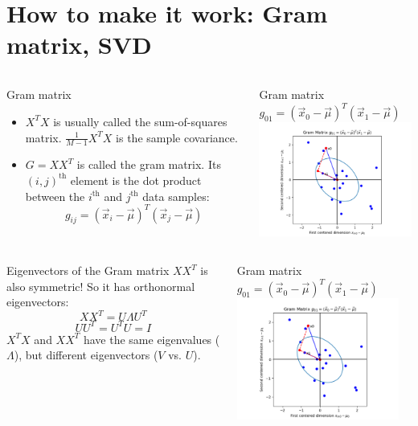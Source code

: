 \documentclass{beamer}
\begin{document}
\section[Gram]{How  to make it work: Gram matrix, SVD}
\setcounter{subsection}{1}

\begin{frame}
  \begin{columns}
    \column{2.125in}
    \begin{block}{Gram matrix}
      \begin{itemize}
      \item $X^TX$ is usually called the sum-of-squares matrix.
        $\frac{1}{M-1}X^TX$ is the sample covariance.
      \item $G=XX^T$ is called the gram matrix.
        Its $(i,j)^{\textrm{th}}$ element is the dot product between
        the $i^{\textrm{th}}$ and $j^{\textrm{th}}$ data samples:
        \[
        g_{ij}=(\vec{x}_i-\vec\mu)^T(\vec{x}_j-\vec\mu)
        \]
      \end{itemize}
    \end{block}
    \column{2.125in}
    \begin{block}{Gram matrix $g_{01}=(\vec{x}_0-\vec\mu)^T(\vec{x}_1-\vec\mu)$}
      \includegraphics[width=2.1in]{gram_matrix.png}
    \end{block}
  \end{columns}
\end{frame}

\begin{frame}
  \begin{columns}
    \column{2.125in}
    \begin{block}{Eigenvectors of the Gram matrix}
      $XX^T$ is also symmetric!  So it has orthonormal eigenvectors:
      \[
      XX^T=U\Lambda U^T
      \]
      \[
      UU^T=U^TU=I
      \]
      $X^TX$ and $XX^T$ have the same eigenvalues ($\Lambda$),
      but different eigenvectors ($V$ vs. $U$).
    \end{block}
    \column{2.125in}
    \begin{block}{Gram matrix $g_{01}=(\vec{x}_0-\vec\mu)^T(\vec{x}_1-\vec\mu)$}
      \includegraphics[width=2.1in]{gram_matrix.png}
    \end{block}
  \end{columns}
\end{frame}
\end{document}
